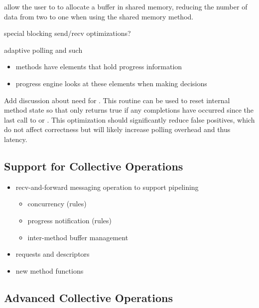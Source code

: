 allow the user to  to allocate a buffer in shared
memory, reducing the number of data from two to one when using the
shared memory method.

special blocking send/recv optimizations?

adaptive polling and such
\begin{itemize}
\item methods have elements that hold progress information
\item progress engine looks at these elements when making decisions
\end{itemize}
  
\todo Add discussion about need for .  This routine
can be used to reset internal method state so that  only
returns true if any completions have occurred since the last call to
 or .  This optimization should
significantly reduce false positives, which do not affect correctness but will
likely increase polling overhead and thus latency.


\subsection{Support for Collective Operations}

\begin{itemize}
\item recv-and-forward messaging operation to support pipelining
  \begin{itemize}
  \item concurrency (rules)
  \item progress notification (rules)
  \item inter-method buffer management
  \end{itemize}
\item requests and descriptors
\item new method functions
\end{itemize}


\subsection{Advanced Collective Operations}

